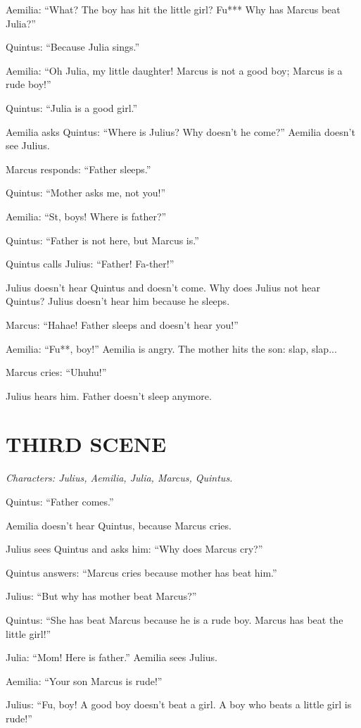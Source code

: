 Aemilia: ``What? The boy has hit the little girl? Fu*** Why has Marcus beat Julia?''

Quintus: ``Because Julia sings.''

Aemilia: ``Oh Julia, my little daughter! Marcus is not a good boy; Marcus is a rude boy!''

Quintus: ``Julia is a good girl.''

Aemilia asks Quintus: ``Where is Julius? Why doesn't he come?'' Aemilia doesn't see Julius.

Marcus responds: ``Father sleeps.''

Quintus: ``Mother asks me, not you!''

Aemilia: ``St, boys! Where is father?''

Quintus: ``Father is not here, but Marcus is.''

Quintus calls Julius: ``Father! Fa-ther!''

Julius doesn't hear Quintus and doesn't come. Why does Julius not hear Quintus? Julius doesn't hear him because he sleeps.

Marcus: ``Hahae! Father sleeps and doesn't hear you!''

Aemilia: ``Fu**, boy!'' Aemilia is angry. The mother hits the son: slap, slap...

Marcus cries: ``Uhuhu!''

Julius hears him. Father doesn't sleep anymore.

\section[Third scene]{THIRD SCENE}
\emph{Characters: Julius, Aemilia, Julia, Marcus, Quintus.}

Quintus: ``Father comes.''

Aemilia doesn't hear Quintus, because Marcus cries.

Julius sees Quintus and asks him: ``Why does Marcus cry?''

Quintus answers: ``Marcus cries because mother has beat him.''

Julius: ``But why has mother beat Marcus?''

Quintus: ``She has beat Marcus because he is a rude boy. Marcus has beat the little girl!''

Julia: ``Mom! Here is father.'' Aemilia sees Julius.

Aemilia: ``Your son Marcus is rude!''

Julius: ``Fu, boy! A good boy doesn't beat a girl. A boy who beats a little girl is rude!''

